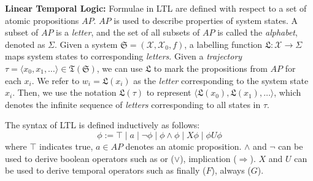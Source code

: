 


\textbf{Linear Temporal Logic:} Formulae in LTL \cite{pnueli1977temporal} are defined with respect to a set of atomic propositions $AP$. $AP$ is used to describe properties of system states. A subset of $AP$ is a \emph{letter}, and the set of all subsets of $AP$ is called the \emph{alphabet}, denoted as $\Sigma$. Given a system $\mathfrak{S}=(\mathcal{X}, \mathcal{X}_0, f)$, a labelling function $\mathfrak{L}: \mathcal{X} \rightarrow \Sigma$ maps system states to corresponding \emph{letters}. Given a \emph{trajectory} $\tau = \langle x_0, x_1, \dots \rangle \in \mathfrak{T}(\mathfrak{S})$, we can use $\mathfrak{L}$ to mark the propositions from $AP$ for each $x_i$. We refer to $w_i = \mathfrak{L}(x_i)$ as the \emph{letter} corresponding to the system state $x_i$. Then, we use the notation $\mathfrak{L}(\tau)$ to represent $\langle \mathfrak{L}(x_0), \mathfrak{L}(x_1), \dots \rangle$, which denotes the infinite sequence of \emph{letters} corresponding to all states in $\tau$.

The syntax of LTL is defined inductively as follows:
\[
\phi := \top \mid a \mid \lnot \phi \mid \phi \land \phi \mid X \phi \mid \phi U \phi
\]
where $\top$ indicates true, $a \in AP$ denotes an atomic proposition. \(\land\) and \(\lnot\) can be used to derive boolean operators such as or (\(\lor\)), implication (\(\Rightarrow\)). $X$ and $U$ can be used to derive temporal operators such as finally (\(F\)), always (\(G\)).

